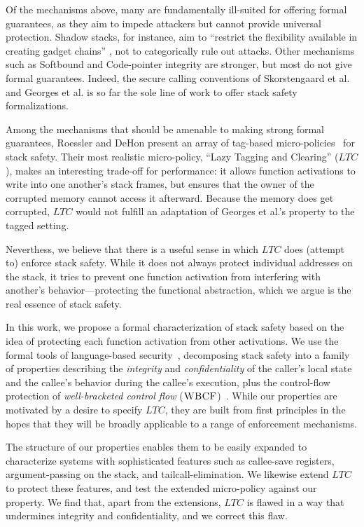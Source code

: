 \documentclass[10pt,conference]{ieeetran}%
\theoremstyle{definition}
\begin{document}
Of the mechanisms above, many are fundamentally ill-suited for offering formal guarantees,
as they aim to impede attackers but cannot provide universal protection. Shadow stacks,
for instance, aim to ``restrict the flexibility available in creating gadget chains''
\cite{Shanbhogue+19}, not to categorically
rule out attacks. Other mechanisms such as Softbound\cite{NagarakatteZMZ09} and Code-pointer
integrity\cite{Kuznetsov+14} are stronger, but most do not give formal guarantees.
Indeed, the secure calling conventions of Skorstengaard et al. \cite{SkorstengaardSTKJFP} and
Georges et al. \cite{Georges22:TempsDesCerises} is so far the sole line of work
to offer stack safety formalizations.

Among the mechanisms that should be amenable to making strong formal guarantees,
Roessler and DeHon \cite{DBLP:conf/sp/RoesslerD18} present an array of tag-based
micro-policies~\cite{pump_oakland2015} for stack safety.
Their most realistic micro-policy, ``Lazy Tagging and Clearing'' (\(LTC\)),
makes an interesting trade-off for performance: it allows function activations to write
into one another's stack frames, but ensures that the owner of the corrupted memory cannot access
it afterward. Because the memory does get corrupted, \(LTC\) would not fulfill an
adaptation of Georges et al.'s property to the tagged setting.

Neverthess, we believe that there is a useful sense in which \(LTC\) does (attempt to) enforce stack safety. 
While it does not always protect individual addresses on the stack, it tries to 
prevent one function activation from interfering with another's behavior---protecting 
the functional abstraction, which we argue is the real essence of stack safety.

In this work, we propose a formal characterization of stack safety based on the idea
of protecting each function activation from other activations.
We use the formal tools of language-based
security~\cite{sabelfeld2003language}, decomposing stack safety into a family of
properties describing
the {\em integrity} and {\em confidentiality} of the caller’s local state
and the callee's behavior during the callee's execution, plus the control-flow protection
of {\em well-bracketed control flow} (\(\textnormal{\sc WBCF}\))~\cite{SkorstengaardSTKJFP}.
While our properties are motivated by a desire to specify \(LTC\), 
they are built from first principles in the hopes that they will be broadly applicable
to a range of enforcement mechanisms.

The structure of our properties enables them to be easily expanded to characterize systems with
sophisticated features such as callee-save registers, argument-passing on the stack,
and tailcall-elimination. We likewise extend \(LTC\) to protect these features, and
test the extended micro-policy against our property. We find that, apart from the extensions, \(LTC\)
is flawed in a way that undermines integrity and confidentiality, and we correct
this flaw.
\end{document}

